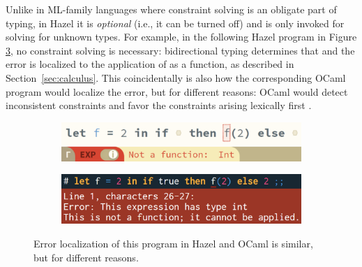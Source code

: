 Unlike in ML-family languages where constraint solving is an obligate part of typing, in Hazel
it is \emph{optional} (i.e., it can be turned off) and is only invoked for solving for unknown types. For example, in the following Hazel program in Figure \ref{fig:localComparison}, no constraint solving is necessary: bidirectional typing determines that  and the error is localized to the application of  as a function, as described in Section~\ref{sec:calculus}. This coincidentally is also how the corresponding OCaml program would localize the error, but for different reasons: OCaml would detect inconsistent constraints and favor the constraints arising lexically first \cite{mcadam1999,odersky1999,pottier2014}.


\begin{figure}[htbp]
\centering
\begin{subfigure}{.5\textwidth}
  \centering
  \includegraphics[width=0.9\linewidth]{images/localExCombined.png}
  \label{fig:hazelLocalEx}
\end{subfigure}%
\begin{subfigure}{.5\textwidth}
  \centering
  \includegraphics[width=0.9\linewidth]{images/ocamlEx.png}
  \label{fig:ocamlEx}
\end{subfigure}
\caption{Error localization of this program in Hazel and OCaml is similar, but for different reasons.}
\label{fig:localComparison}
\end{figure}


